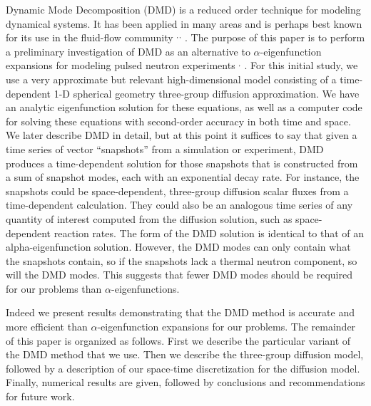 \documentclass[12pt]{article}
\begin{document}
Dynamic Mode Decomposition (DMD) is a reduced order technique for modeling
	dynamical systems.
It has been applied in many areas and is perhaps best known for its use in the 
	fluid-flow community 
	\cite{dmd2016}$^,$\cite{schmid2010}$^,$\cite{jovanovic2012low} .
The purpose of this paper is to perform a preliminary investigation of DMD as 
	an alternative to $\alpha$-eigenfunction expansions for modeling pulsed 
	neutron experiments \cite{abdo2018}$^,$\cite{rm} .
For this initial study, we use a very approximate but relevant high-dimensional 
	model consisting of a time-dependent 1-D spherical geometry three-group 
	diffusion approximation. 
We have an analytic eigenfunction solution for these equations, as well as a 
	computer code for solving these equations with second-order accuracy in both 
	time and space.  
We later describe DMD in detail, but at this point it suffices to say that 
	given a time series of vector ``snapshots'' from a simulation or experiment, 
	DMD produces a time-dependent solution for those snapshots that is 
	constructed from a sum of snapshot modes, each with an exponential decay rate.
For instance, the snapshots could be space-dependent, three-group diffusion 
	scalar fluxes from a time-dependent calculation.  
They could also be an analogous time series of any quantity of interest 
	computed from the diffusion solution, such as space-dependent reaction rates.
The form of the DMD solution is identical to that of an alpha-eigenfunction  
	solution.  
However, the DMD modes can only contain what the snapshots contain, so if the 
	snapshots lack a thermal neutron component, so will the DMD modes.
This suggests that fewer DMD modes should be required for our problems than
	$\alpha$-eigenfunctions.

Indeed we present results demonstrating that the DMD method is accurate and 
	more efficient than $\alpha$-eigenfunction expansions for our problems.  
The remainder of this paper is organized as follows.  
First we describe the particular variant of the DMD method that we use.  
Then we describe the three-group diffusion model, followed by a description of 
	our space-time discretization for the diffusion model.  
Finally, numerical results are given, followed by conclusions and 
	recommendations for future work.
\end{document}
